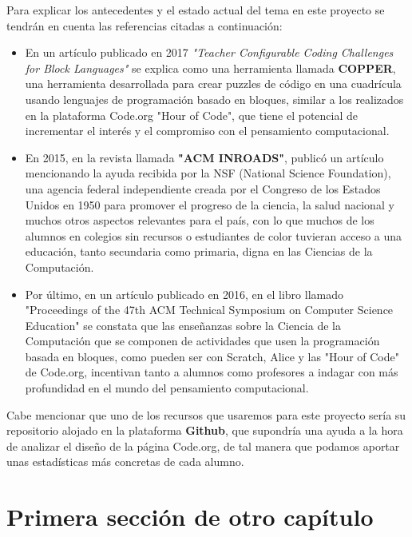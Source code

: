 

Para explicar los antecedentes y el estado actual del tema en este proyecto se tendrán en cuenta las referencias citadas a continuación:

\begin{itemize}
  \item En un artículo publicado en 2017 \textit{"Teacher Configurable Coding Challenges for Block Languages"} se explica como una herramienta llamada \textbf{COPPER}\cite{Tumlin:2017:TCC:3017680.3022467}, una herramienta desarrollada para crear puzzles de código en una cuadrícula usando lenguajes de programación basado en bloques, similar a los realizados en la plataforma Code.org "Hour of Code", que tiene el potencial de incrementar el interés y el compromiso con el pensamiento computacional.
  \item En 2015, en la revista llamada \textbf{"ACM INROADS"}, publicó un artículo\cite{Wilson:2015:HCB:2786608.2746406} mencionando la ayuda recibida por la NSF (National Science Foundation), una agencia federal independiente creada por el Congreso de los Estados Unidos en 1950 para promover el progreso de la ciencia, la salud nacional y muchos otros aspectos relevantes para el país, con lo que muchos de los alumnos en colegios sin recursos o estudiantes de color tuvieran acceso a una educación, tanto secundaria como primaria, digna en las Ciencias de la Computación.
  \item Por último, en un artículo\cite{Brown:2016:PFD:2839509.2844661} publicado en 2016, en el libro llamado "Proceedings of the 47th ACM Technical Symposium on Computer Science Education"  se constata que las enseñanzas sobre la Ciencia de la Computación que se componen de actividades que usen la programación basada en bloques, como pueden ser con Scratch, Alice y las "Hour of Code" de Code.org, incentivan tanto a alumnos como profesores a indagar con más profundidad en el mundo del pensamiento computacional.

\end{itemize}

Cabe mencionar que uno de los recursos que usaremos para este proyecto sería su repositorio alojado en la plataforma \textbf{Github}, que supondría una ayuda a la hora de analizar el diseño de la página Code.org, de tal manera que podamos aportar unas estadísticas más concretas de cada alumno.


\section{Primera sección de otro capítulo}
\label{:sec1}

